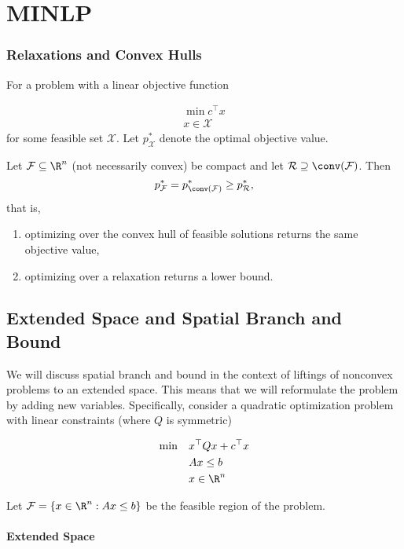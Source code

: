 \chapter{MINLP}
\newcommand{\lift}{\mathrm{lift}}
\newcommand{\ub}{\mathrm{ubbest}}
\newcommand{\F}{{\mathcal F}}

\subsection{Relaxations and Convex Hulls}

For a problem with a linear objective function

\begin{align}
\min c^\top x\\
 x\in \mathcal X
\end{align}
for some feasible set $\mathcal X$.  Let $p^*_{\mathcal X}$ denote the optimal objective value.
\begin{theorem}
Let $\mathcal F \subseteq \R^n$ (not necessarily convex) be compact and let $\mathcal R \supseteq \conv(\mathcal F)$.  Then 
$$
p^*_\mathcal F = p^*_{\conv(\mathcal{F})} \geq p^*_{\mathcal R},
$$
that is, 
\begin{enumerate}
\item optimizing over the convex hull of feasible solutions returns the same objective value,
\item optimizing over a relaxation returns a lower bound.
\end{enumerate}
\end{theorem}

\section{Extended Space and Spatial Branch and Bound}
We will discuss spatial branch and bound in the context of liftings of nonconvex problems to an extended space.  This means that we will reformulate the problem by adding new variables.  Specifically,  consider a quadratic optimization problem with linear constraints (where $Q$ is symmetric)

\begin{align}
\min\quad  &x^\top Q x + c^\top x\\
&Ax \leq b\\
&x \in \R^n
\end{align}

Let $\F = \{  x\in \R^n : Ax \leq b\}$ be the feasible region of the problem.

\subsubsection{Extended Space}

